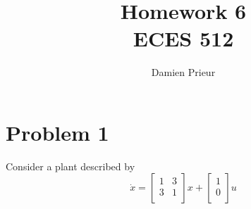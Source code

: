 \documentclass{article}
\author{Damien Prieur}
\title{Homework 6\\ ECES 512}
\date{}
\begin{document}
\maketitle

\section*{Problem 1}
Consider a plant described by
$$
\dot{x} =
\begin{bmatrix}
1 & 3 \\
3 & 1 \\
\end{bmatrix}
x
+
\begin{bmatrix}
1 \\
0 \\
\end{bmatrix}
u
$$
\end{document}
